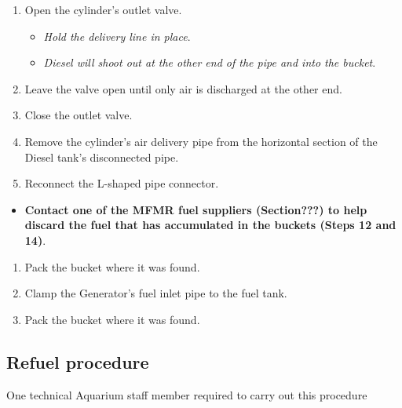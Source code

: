 \documentclass[
  12pt,
]{report}
\providecommand{\tightlist}{%
  \setlength{\itemsep}{0pt}\setlength{\parskip}{0pt}}\usepackage{longtable,booktabs,array}
\begin{document}
\begin{enumerate}
\def\labelenumi{\arabic{enumi}.}
\setcounter{enumi}{6}
\tightlist
\item
  Open the cylinder's outlet valve.

  \begin{itemize}
  \tightlist
  \item
    \emph{Hold the delivery line in place}.
  \item
    \emph{Diesel will shoot out at the other end of the pipe and into
    the bucket}.
  \end{itemize}
\item
  Leave the valve open until only air is discharged at the other end.
\item
  Close the outlet valve.
\item
  Remove the cylinder's air delivery pipe from the horizontal section of
  the Diesel tank's disconnected pipe.
\item
  Reconnect the L-shaped pipe connector.
\end{enumerate}

\begin{itemize}
\tightlist
\item
  \textbf{Contact one of the MFMR fuel suppliers (Section???) to help
  discard the fuel that has accumulated in the buckets (Steps 12 and
  14)}.
\end{itemize}

\begin{enumerate}
\def\labelenumi{\arabic{enumi}.}
\setcounter{enumi}{11}
\tightlist
\item
  Pack the bucket where it was found.
\item
  Clamp the Generator's fuel inlet pipe to the fuel tank.
\item
  Pack the bucket where it was found.
\end{enumerate}

\hypertarget{refuel-procedure}{%
\subsection{Refuel procedure}\label{refuel-procedure}}

{One technical Aquarium staff member required to carry out this
procedure}
\end{document}
